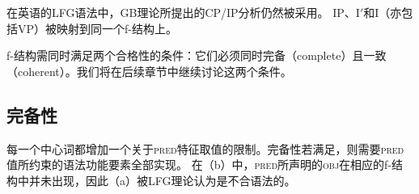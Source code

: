 \noindent
在英语的LFG语法中，GB理论所提出的CP/IP分析仍然被采用。
IP、I$'$和I（亦包括VP）被映射到同一个f-结构上。

\eal
{}

%
\hspace*{4em}%
{}
\zl




\noindent
f-结构需同时满足两个合格性的条件：它们必须同时完备（complete）且一致（coherent）。我们将在后续章节中继续讨论这两个条件。

\subsection{完备性}

每一个中心词都增加一个关于\textsc{pred}特征取值的限制。完备性若满足，则需要\textsc{pred}值所约束的语法功能要素全部实现。
在（b）中，\textsc{pred}所声明的\textsc{obj}在相应的f-结构中并未出现，因此（a）被LFG理论认为是不合语法的。

\eal
{}
\zl

